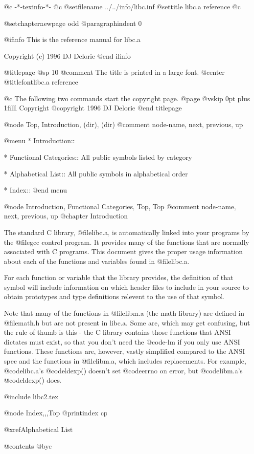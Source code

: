    @c -*-texinfo-*-
@c %
@setfilename ../../info/libc.inf
@settitle libc.a reference
@c %

@setchapternewpage odd
@paragraphindent 0

@ifinfo
This is the reference manual for libc.a

Copyright (c) 1996 DJ Delorie
@end ifinfo

@titlepage
@sp 10
@comment The title is printed in a large font.
@center @titlefont{libc.a reference}

@c The following two commands start the copyright page.
@page
@vskip 0pt plus 1filll
Copyright @copyright{} 1996 DJ Delorie
@end titlepage

@node    Top,       Introduction,  (dir),    (dir)
@comment node-name, next,          previous, up

@menu
* Introduction::

* Functional Categories::  All public symbols listed by
                           category

* Alphabetical List::      All public symbols in alphabetical
                           order

* Index::
@end menu

@node    Introduction, Functional Categories, Top,      Top
@comment node-name,    next,                  previous, up
@chapter Introduction

The standard C library, @file{libc.a}, is automatically linked into your
programs by the @file{gcc} control program.  It provides many of the
functions that are normally associated with C programs.  This document
gives the proper usage information about each of the functions and
variables found in @file{libc.a}. 

For each function or variable that the library provides, the definition
of that symbol will include information on which header files to include
in your source to obtain prototypes and type definitions relevent to the
use of that symbol. 

Note that many of the functions in @file{libm.a} (the math library) are
defined in @file{math.h} but are not present in libc.a.  Some are, which
may get confusing, but the rule of thumb is this - the C library
contains those functions that ANSI dictates must exist, so that you
don't need the @code{-lm} if you only use ANSI functions.  These
functions are, however, vastly simplified compared to the ANSI spec and
the functions in @file{libm.a}, which includes replacements.  For
example, @code{libc.a}'s @code{ldexp()} doesn't set @code{errno} on
error, but @code{libm.a}'s @code{ldexp()} does.

@include libc2.tex

@node Index,,,Top
@printindex cp

@xref{Alphabetical List}

@contents
@bye

